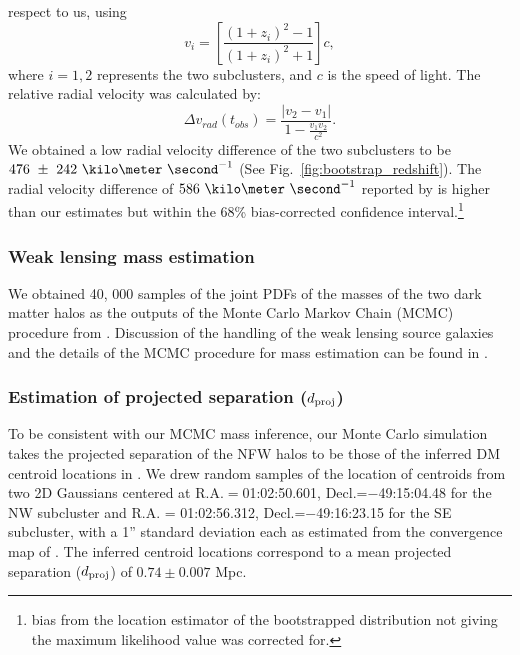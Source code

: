 \documentclass[letterpaper,useAMS,usenatbib]{mn2e}
\begin{document}
respect to us, using  
\begin{equation}
	v_i = \left[ \frac{(1+z_i)^2 - 1 }{(1+z_i)^2 + 1 }\right]c,
\end{equation}
where $i=1, 2$ represents the two subclusters, and $c$ is the speed of
light. The relative radial velocity was calculated by: 
\begin{equation}
	\Delta v_{rad}(t_{obs}) = \frac{|v_2 - v_1|}{1-\frac{v_1 v_2}{c^2}}.
\end{equation}
We obtained a low radial velocity difference of the two subclusters to be
$476~\pm~242~\kilo\meter~\second^{-1}$ (See Fig.~\ref{fig:bootstrap_redshift}). 
The radial velocity difference of $586~\kilo \meter~\second^{-1}$ reported by  
is higher than our estimates but within the 68\% bias-corrected
confidence interval.\footnote{bias from the location estimator of
	the bootstrapped distribution not giving the maximum likelihood value was
corrected for.} 
\subsubsection{Weak lensing mass estimation} 
\label{subsubsec:WL_mass_estimate}
We obtained 40, 000 samples of the joint PDFs of the masses of the two dark
matter halos as the outputs of the Monte Carlo Markov Chain (MCMC)
procedure from \citealt{Jee13}. Discussion of the handling of the weak
lensing source galaxies and the details of the MCMC procedure for mass
estimation can be found in \citealt{Jee13}. 
\subsubsection{Estimation of projected separation ($d_{\rm proj}$)} 
\label{subsubsec:proj_sep}
To be consistent with our MCMC mass inference, our Monte Carlo simulation takes 
the projected separation of the NFW halos to be those of the inferred
DM centroid locations in \citealt{Jee13}. We drew random samples
 of the location of centroids from two 2D Gaussians centered at
 R.A.$=$01:02:50.601, Decl.=$-$49:15:04.48 for the NW subcluster and R.A. =
 01:02:56.312, Decl.=$-$49:16:23.15 for the SE
subcluster, with a 1'' standard deviation each as estimated from the
convergence map of \citet{Jee13}. The
inferred centroid locations correspond to a mean projected separation
($d_{\rm proj}$) of $0.74\pm {0.007}$ Mpc.  
\end{document}
